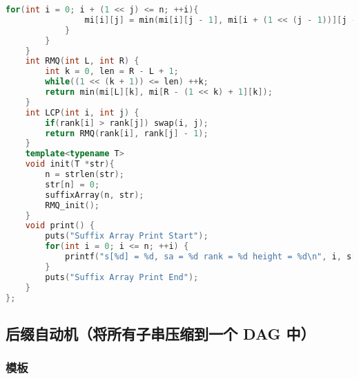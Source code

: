 \begin{lstlisting}[language=C++]
            for(int i = 0; i + (1 << j) <= n; ++i){
                mi[i][j] = min(mi[i][j - 1], mi[i + (1 << (j - 1))][j - 1]);
            }
        }
    }
    int RMQ(int L, int R) {
        int k = 0, len = R - L + 1;
        while((1 << (k + 1)) <= len) ++k;
        return min(mi[L][k], mi[R - (1 << k) + 1][k]);
    }
    int LCP(int i, int j) {
        if(rank[i] > rank[j]) swap(i, j);
        return RMQ(rank[i], rank[j] - 1);
    }
    template<typename T>
    void init(T *str){
        n = strlen(str);
        str[n] = 0;
        suffixArray(n, str);
        RMQ_init();
    }
    void print() {
        puts("Suffix Array Print Start");
        for(int i = 0; i <= n; ++i) {
            printf("s[%d] = %d, sa = %d rank = %d height = %d\n", i, s[i], sa[i], rank[i], height[i]);
        }
        puts("Suffix Array Print End");
    }
};
\end{lstlisting}

\subsection{后缀自动机（将所有子串压缩到一个 DAG 中）}

\subsubsection{模板}

